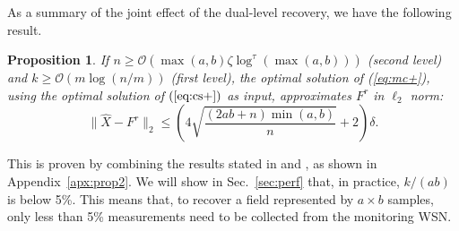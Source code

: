 \documentclass[conference]{IEEEtran}
\newtheorem{prop}{Proposition}
\begin{document}
    As a summary of the joint effect of the dual-level recovery, we have the following result.
\begin{prop} \label{prop2}
If $n \ge \mathcal{O}(\max(a,b) \zeta \log^\tau\!(\max(a,b)))$ (second level) and $k \ge \mathcal{O}\left(m\log(n/m)\right)$ (first level), the optimal solution of (\ref{eq:mc+}), using the optimal solution of $(\ref{eq:cs+})$ as input, approximates $F^r$ in $\ell_2$ norm:
      \[ \|\hat{X} - F^r\|_2 \le \left(4\sqrt{\frac{(2ab+n)\min(a,b)}{n}} + 2\right)\delta.\]
\end{prop}
This is proven by combining the results stated in \cite{Candes-SPMag08} and \cite{CandesP-ProcIEEE10}, as shown in Appendix~\ref{apx:prop2}. We will show in Sec.~\ref{sec:perf} that, in practice, $k/(ab)$ is below 5\%. This means that, to recover a field represented by $a\times b$ samples, only less than 5\% measurements need to be collected from the monitoring WSN.
\end{document}
